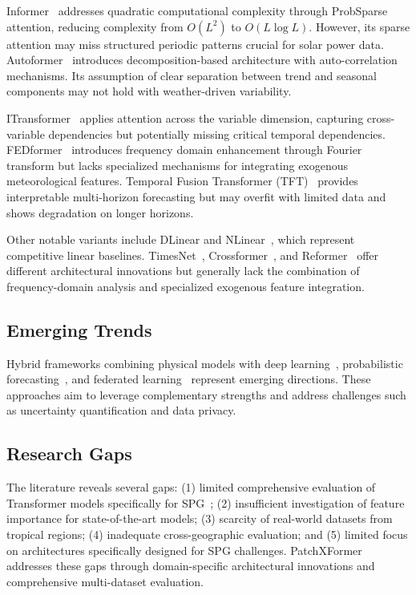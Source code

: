 \documentclass[a4paper,fleqn]{cas-dc}
\begin{document}
Informer~\cite{zhou2021informer} addresses quadratic computational complexity through ProbSparse attention, reducing complexity from $O(L^2)$ to $O(L \log L)$. However, its sparse attention may miss structured periodic patterns crucial for solar power data. Autoformer~\cite{wu2021autoformer} introduces decomposition-based architecture with auto-correlation mechanisms. Its assumption of clear separation between trend and seasonal components may not hold with weather-driven variability.

ITransformer~\cite{liu2023itransformer} applies attention across the variable dimension, capturing cross-variable dependencies but potentially missing critical temporal dependencies. FEDformer~\cite{zhou2022fedformer} introduces frequency domain enhancement through Fourier transform but lacks specialized mechanisms for integrating exogenous meteorological features. Temporal Fusion Transformer (TFT)~\cite{lim2021temporal} provides interpretable multi-horizon forecasting but may overfit with limited data and shows degradation on longer horizons.

Other notable variants include DLinear and NLinear~\cite{zeng2023transformers}, which represent competitive linear baselines. TimesNet~\cite{wu2022timesnet}, Crossformer~\cite{zhang2023crossformer}, and Reformer~\cite{kitaev2020reformer} offer different architectural innovations but generally lack the combination of frequency-domain analysis and specialized exogenous feature integration.

\subsection{Emerging Trends}

Hybrid frameworks combining physical models with deep learning~\cite{salman2024hybrid,timplalexis2020hybrid}, probabilistic forecasting~\cite{lauret2017probabilistic}, and federated learning~\cite{moradzadeh2023novel,luo2025distributed} represent emerging directions. These approaches aim to leverage complementary strengths and address challenges such as uncertainty quantification and data privacy.

\subsection{Research Gaps}

The literature reveals several gaps: (1) limited comprehensive evaluation of Transformer models specifically for SPG~\cite{alali2023solar,sherozbek2023transformers}; (2) insufficient investigation of feature importance for state-of-the-art models; (3) scarcity of real-world datasets from tropical regions; (4) inadequate cross-geographic evaluation; and (5) limited focus on architectures specifically designed for SPG challenges. PatchXFormer addresses these gaps through domain-specific architectural innovations and comprehensive multi-dataset evaluation.
\end{document}
